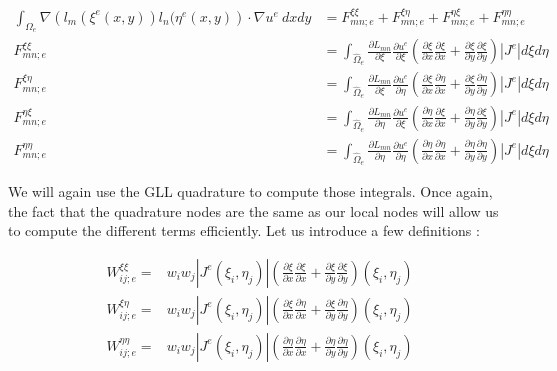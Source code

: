 \begin{align*}
\int_{\Omega_e} \nabla \left( l_m(\xi^e(x,y))l_n(\eta^e(x,y)\right) \cdot \nabla u^e \: dxdy &= F^{\xi\xi}_{mn;e} + F^{\xi\eta}_{mn;e} + F^{\eta\xi}_{mn;e} + F^{\eta\eta}_{mn;e} \\
F^{\xi\xi}_{mn;e} &= \int_{\hat{\Omega}_e} \frac{\partial L_{mn}}{\partial \xi}\frac{\partial u^e}{\partial \xi} \left(\frac{\partial \xi}{\partial x}\frac{\partial \xi}{\partial x}+\frac{\partial \xi}{\partial y}\frac{\partial \xi}{\partial y}\right) |J^e| d\xi d\eta\\
F^{\xi\eta}_{mn;e} &= \int_{\hat{\Omega}_e} \frac{\partial L_{mn}}{\partial \xi}\frac{\partial u^e}{\partial \eta} \left(\frac{\partial \xi}{\partial x}\frac{\partial \eta}{\partial x}+\frac{\partial \xi}{\partial y}\frac{\partial \eta}{\partial y}\right) |J^e| d\xi d\eta\\
F^{\eta\xi}_{mn;e} &= \int_{\hat{\Omega}_e} \frac{\partial L_{mn}}{\partial \eta}\frac{\partial u^e}{\partial \xi} \left(\frac{\partial \eta}{\partial x}\frac{\partial \xi}{\partial x}+\frac{\partial \eta}{\partial y}\frac{\partial \xi}{\partial y}\right) |J^e| d\xi d\eta\\
F^{\eta\eta}_{mn;e} &= \int_{\hat{\Omega}_e} \frac{\partial L_{mn}}{\partial \eta}\frac{\partial u^e}{\partial \eta} \left(\frac{\partial \eta}{\partial x}\frac{\partial \eta}{\partial x}+\frac{\partial \eta}{\partial y}\frac{\partial \eta}{\partial y}\right) |J^e| d\xi d\eta
\end{align*}

We will again use the GLL quadrature to compute those integrals. Once again, the fact that the quadrature nodes are the same as our local nodes will allow us to compute the different terms efficiently. Let us introduce a few definitions : 

\begin{align*}
W_{ij;e}^{\xi\xi} =& w_i w_j |J^e(\xi_i,\eta_j)| \left(\frac{\partial \xi}{\partial x}\frac{\partial \xi}{\partial x}+\frac{\partial \xi}{\partial y}\frac{\partial \xi}{\partial y}\right)(\xi_i,\eta_j)\\
W_{ij;e}^{\xi\eta} =& w_i w_j |J^e(\xi_i,\eta_j)| \left(\frac{\partial \xi}{\partial x}\frac{\partial \eta}{\partial x}+\frac{\partial \xi}{\partial y}\frac{\partial \eta}{\partial y}\right)(\xi_i,\eta_j)\\
W_{ij;e}^{\eta\eta} =& w_i w_j |J^e(\xi_i,\eta_j)| \left(\frac{\partial \eta}{\partial x}\frac{\partial \eta}{\partial x}+\frac{\partial \eta}{\partial y}\frac{\partial \eta}{\partial y}\right)(\xi_i,\eta_j)
\end{align*}

